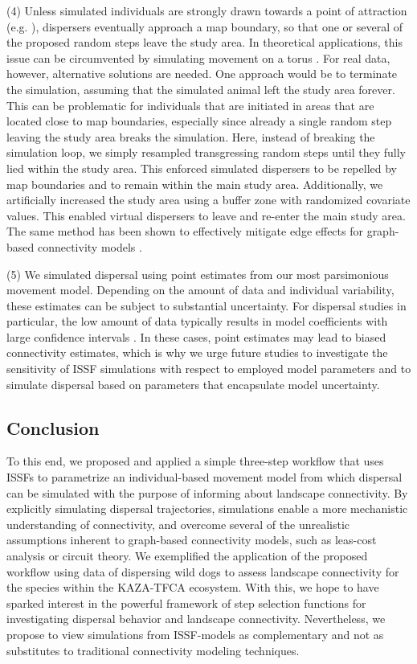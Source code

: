 \documentclass[abstract=on,10pt,a4paper,bibliography=totocnumbered]{article}
\begin{document}
(4) Unless simulated individuals are strongly drawn towards a point of
attraction (e.g. \cite{Signer.2017}), dispersers eventually approach a map
boundary, so that one or several of the proposed random steps leave the study
area. In theoretical applications, this issue can be circumvented by simulating
movement on a torus \citep{Hodel.2022}. For real data, however, alternative
solutions are needed. One approach would be to terminate the simulation,
assuming that the simulated animal left the study area forever. This can be
problematic for individuals that are initiated in areas that are located close
to map boundaries, especially since already a single random step leaving the
study area breaks the simulation. Here, instead of breaking the simulation loop,
we simply resampled transgressing random steps until they fully lied within the
study area. This enforced simulated dispersers to be repelled by map boundaries
and to remain within the main study area. Additionally, we artificially
increased the study area using a buffer zone with randomized covariate values.
This enabled virtual dispersers to leave and re-enter the main study area. The
same method has been shown to effectively mitigate edge effects for graph-based
connectivity models \citep{Koen.2010}.

(5) We simulated dispersal using point estimates from our most parsimonious
movement model. Depending on the amount of data and individual variability,
these estimates can be subject to substantial uncertainty. For dispersal studies
in particular, the low amount of data typically results in model coefficients
with large confidence intervals \citep{Wiegand.2003, KramerSchadt.2007}. In
these cases, point estimates may lead to biased connectivity estimates, which is
why we urge future studies to investigate the sensitivity of ISSF simulations
with respect to employed model parameters and to simulate dispersal based on
parameters that encapsulate model uncertainty.

\subsection{Conclusion}
To this end, we proposed and applied a simple three-step workflow that uses
ISSFs to parametrize an individual-based movement model from which dispersal can
be simulated with the purpose of informing about landscape connectivity. By
explicitly simulating dispersal trajectories, simulations enable a more
mechanistic understanding of connectivity, and overcome several of the
unrealistic assumptions inherent to graph-based connectivity models, such as
leas-cost analysis or circuit theory. We exemplified the application of the
proposed workflow using data of dispersing wild dogs to assess landscape
connectivity for the species within the KAZA-TFCA ecosystem. With this, we hope
to have sparked interest in the powerful framework of step selection functions
for investigating dispersal behavior and landscape connectivity. Nevertheless,
we propose to view simulations from ISSF-models as complementary and not as
substitutes to traditional connectivity modeling techniques.
\end{document}
